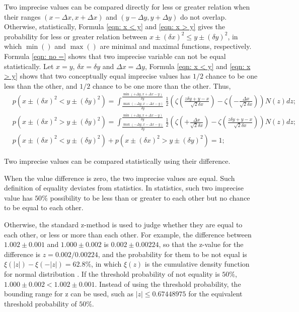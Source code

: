 \documentclass[twoside]{article}
\numberwithin{equation}{section}
\begin{document}
Two imprecise values can be compared directly for less or greater relation when their ranges $(x - \Delta x, x + \Delta x)$ and $(y - \Delta y, y + \Delta y)$ do not overlap. 
Otherwise, statistically, Formula \eqref{eqn: x < y} and \eqref{eqn: x > y} gives the probability for less or greater relation between $x \pm (\delta x)^2 \le y \pm (\delta y)^2$, in which $\min()$ and $\max()$ are minimal and maximal functions, respectively.
Formula \eqref{eqn: no =} shows that two imprecise variable can not be equal statistically.
Let $x = y$, $\delta x = \delta y$ and $\Delta x = \Delta y$, Formula \eqref{eqn: x < y} and \eqref{eqn: x > y} shows that two conceptually equal imprecise values has $1/2$ chance to be one less than the other, and $1/2$ chance to be one more than the other.
Thus,
\begin{align}
\label{eqn: x < y}
& p\left( x \pm (\delta x)^2 < y \pm (\delta y)^2 \right) = 
  \int_{\frac{\max(-\Delta y, x - \Delta x - y)}{\delta y}}^{\frac{\min(+\Delta y, x + \Delta x - y)}{\delta y}} 
      \frac{1}{2} \left(\zeta(\frac{z \delta y + y - x}{\sqrt{2} \delta x}) - \zeta(-\frac{\Delta x}{\sqrt{2} \delta x})\right) N(z) d z; \\
\label{eqn: x > y}
& p\left( x \pm (\delta x)^2 > y \pm (\delta y)^2 \right) =     
  \int_{\frac{\max(-\Delta y, x - \Delta x - y)}{\delta y}}^{\frac{\min(+\Delta y, x + \Delta x - y)}{\delta y}} 
      \frac{1}{2} \left(\zeta(+\frac{\Delta x}{\sqrt{2} \delta x}) - \zeta(\frac{z \delta y + y - x}{\sqrt{2} \delta x})\right) N(z) d z; \\
\label{eqn: no =}
& p\left( x \pm (\delta x)^2 < y \pm (\delta y)^2 \right) + p\left( x \pm (\delta x)^2 > y \pm (\delta y)^2 \right) = 1;
\end{align}

\fi

Two imprecise values can be compared statistically using their difference.

When the value difference is zero, the two imprecise values are equal.  
Such definition of equality deviates from statistics.
In statistics, such two imprecise value has $50\%$ possibility to be less than or greater to each other but no chance to be equal to each other.

Otherwise, the standard z-method \cite{Probability_Statistics} is used to judge whether they are equal to each other, or less or more than each other.
For example, the difference between $1.002 \pm 0.001$ and $1.000 \pm 0.002$ is $0.002 \pm 0.00224$, so that the z-value for the difference is $z = 0.002 / 0.00224$, and the probability for them to be not equal is $\xi(|z|) - \xi(-|z|) = 62.8\%$, in which $\xi(z)$ is the cumulative density function for normal distribution \cite{Probability_Statistics}.
If the threshold probability of not equality is $50\%$, $1.000 \pm 0.002 < 1.002 \pm 0.001$.
Instead of using the threshold probability, the bounding range for z can be used, such as $|z| \leq 0.67448975$ for the equivalent threshold probability of $50\%$.
\end{document}
